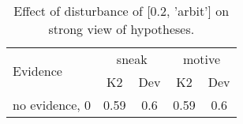 \begin{table}\begin{tabular}{l|cc|cc}\toprule\multirow{2}{*}{Evidence} & \multicolumn{2}{c}{sneak}& \multicolumn{2}{c}{motive}\\& {K2} & {Dev}& {K2} & {Dev}\\\midrule
no evidence, 0 & 0.59&0.6&0.59&0.6\\\bottomrule\end{tabular}\caption{Effect of disturbance of [0.2, 'arbit'] on strong view of hypotheses.}\end{table}